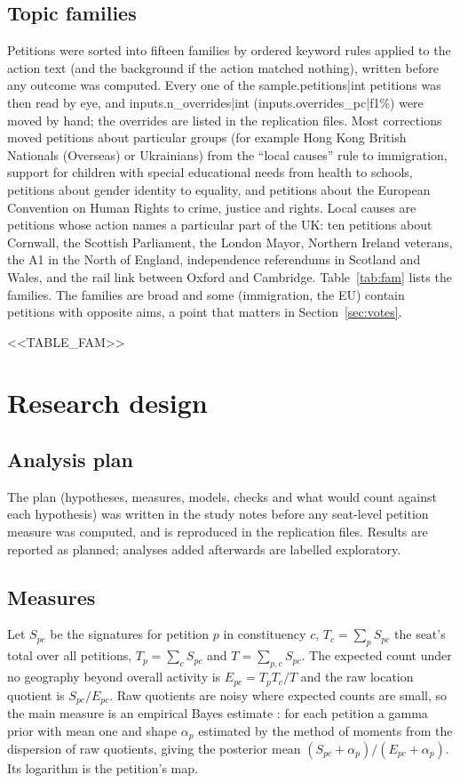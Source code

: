 \documentclass[11pt,a4paper]{article}
\begin{document}
\subsection{Topic families}\label{sec:topics}
Petitions were sorted into fifteen families by ordered keyword rules applied to the action text (and the background if the action matched nothing), written before any outcome was computed. Every one of the {{sample.petitions|int}} petitions was then read by eye, and {{inputs.n_overrides|int}} ({{inputs.overrides_pc|f1}}\%) were moved by hand; the overrides are listed in the replication files. Most corrections moved petitions about particular groups (for example Hong Kong British Nationals (Overseas) or Ukrainians) from the ``local causes'' rule to immigration, support for children with special educational needs from health to schools, petitions about gender identity to equality, and petitions about the European Convention on Human Rights to crime, justice and rights. Local causes are petitions whose action names a particular part of the UK: ten petitions about Cornwall, the Scottish Parliament, the London Mayor, Northern Ireland veterans, the A1 in the North of England, independence referendums in Scotland and Wales, and the rail link between Oxford and Cambridge. Table~\ref{tab:fam} lists the families. The families are broad and some (immigration, the EU) contain petitions with opposite aims, a point that matters in Section~\ref{sec:votes}.

<<TABLE_FAM>>

\section{Research design}\label{sec:design}
\subsection{Analysis plan}
The plan (hypotheses, measures, models, checks and what would count against each hypothesis) was written in the study notes before any seat-level petition measure was computed, and is reproduced in the replication files. Results are reported as planned; analyses added afterwards are labelled exploratory.

\subsection{Measures}
Let $S_{pc}$ be the signatures for petition $p$ in constituency $c$, $T_c=\sum_p S_{pc}$ the seat's total over all petitions, $T_p=\sum_c S_{pc}$ and $T=\sum_{p,c}S_{pc}$. The expected count under no geography beyond overall activity is $E_{pc}=T_pT_c/T$ and the raw location quotient is $S_{pc}/E_{pc}$. Raw quotients are noisy where expected counts are small, so the main measure is an empirical Bayes estimate \citep{claytonkaldor1987}: for each petition a gamma prior with mean one and shape $\alpha_p$ estimated by the method of moments from the dispersion of raw quotients, giving the posterior mean $(S_{pc}+\alpha_p)/(E_{pc}+\alpha_p)$. Its logarithm is the petition's map.
\end{document}
